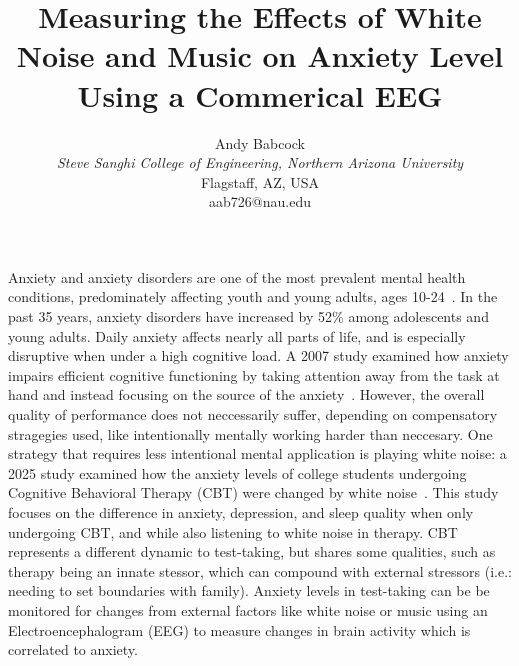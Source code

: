 \documentclass[journal]{IEEEtran}
\begin{document}
\title{Measuring the Effects of White Noise and Music on Anxiety Level Using a Commerical EEG}

\author{Andy Babcock \\
    \textit{Steve Sanghi College of Engineering, Northern Arizona University} \\
    Flagstaff, AZ, USA \\
    aab726@nau.edu
}

\maketitle

%

Anxiety and anxiety disorders are one of the most prevalent mental health conditions, predominately affecting youth and young adults, ages 10-24~\cite{bieRisingGlobalBurden2024}. In the past 35 years, anxiety disorders have increased by 52\% among adolescents and young adults. Daily anxiety affects nearly all parts of life, and is especially disruptive when under a high cognitive load. A 2007 study examined how anxiety impairs efficient cognitive functioning by taking attention away from the task at hand and instead focusing on the source of the anxiety~\cite{eysenckAnxietyCognitivePerformance2007}. However, the overall quality of performance does not neccessarily suffer, depending on compensatory stragegies used, like intentionally mentally working harder than neccesary. One strategy that requires less intentional mental application is playing white noise: a 2025 study examined how the anxiety levels of college students undergoing Cognitive Behavioral Therapy (CBT) were changed by white noise~\cite{liEffectWhiteNoise2025}. This study focuses on the difference in anxiety, depression, and sleep quality when only undergoing CBT, and while also listening to white noise in therapy. CBT represents a different dynamic to test-taking, but shares some qualities, such as therapy being an innate stessor, which can compound with external stressors (i.e.: needing to set boundaries with family). Anxiety levels in test-taking can be be monitored for changes from external factors like white noise or music using an Electroencephalogram (EEG) to measure changes in brain activity which is correlated to anxiety.
\end{document}
